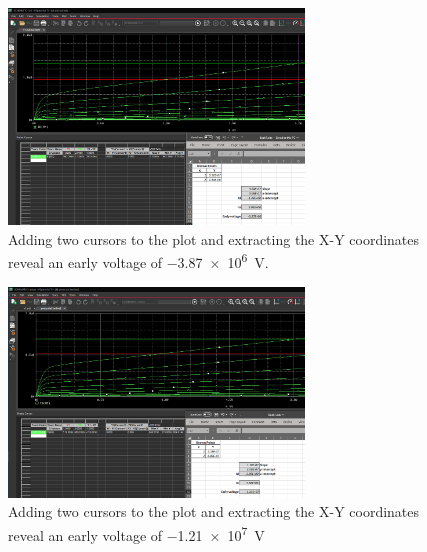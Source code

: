 \documentclass{article}
\begin{document}
	\begin{figure}[H]
	    \centering
	    \includegraphics[width=0.7\textwidth]{nmos-early}
	    \caption{Adding two cursors to the plot and extracting the X-Y coordinates reveal an early voltage of \SI{-3.87e6}{\volt}.}
	\end{figure}


	\begin{figure}[H]
	    \centering
	    \includegraphics[width=0.7\textwidth]{pmos-early}
	    \caption{Adding two cursors to the plot and extracting the X-Y coordinates reveal an early voltage of \SI{-1.21e7}{\volt}}
	\end{figure}
	
\end{document}
